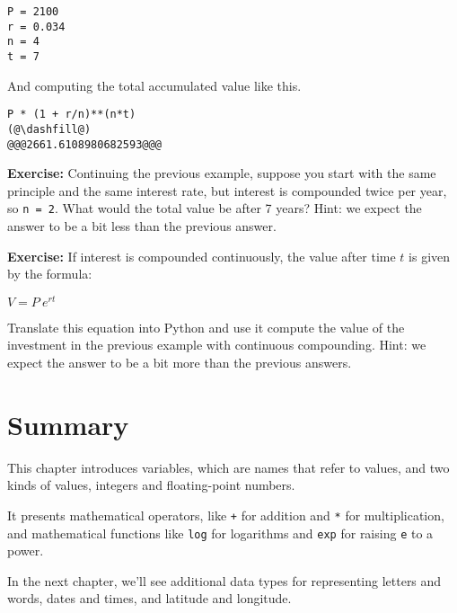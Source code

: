 \begin{lstlisting}[]
P = 2100
r = 0.034
n = 4
t = 7
\end{lstlisting}

And computing the total accumulated value like this.

\begin{lstlisting}[]
P * (1 + r/n)**(n*t)
(@\dashfill@)
@@@2661.6108980682593@@@
\end{lstlisting}

\textbf{Exercise:} Continuing the previous example, suppose you start
with the same principle and the same interest rate, but interest is
compounded twice per year, so \passthrough{\lstinline!n = 2!}. What
would the total value be after 7 years? Hint: we expect the answer to be
a bit less than the previous answer.

\textbf{Exercise:} If interest is compounded continuously, the value
after time \(t\) is given by the formula:

\(V=P~e^{rt}\)

Translate this equation into Python and use it compute the value of the
investment in the previous example with continuous compounding. Hint: we
expect the answer to be a bit more than the previous answers.

\hypertarget{summary}{%
\section{Summary}\label{summary}}

This chapter introduces variables, which are names that refer to values,
and two kinds of values, integers and floating-point numbers.

It presents mathematical operators, like \passthrough{\lstinline!+!} for
addition and \passthrough{\lstinline!*!} for multiplication, and
mathematical functions like \passthrough{\lstinline!log!} for logarithms
and \passthrough{\lstinline!exp!} for raising
\passthrough{\lstinline!e!} to a power.

In the next chapter, we'll see additional data types for representing
letters and words, dates and times, and latitude and longitude.

